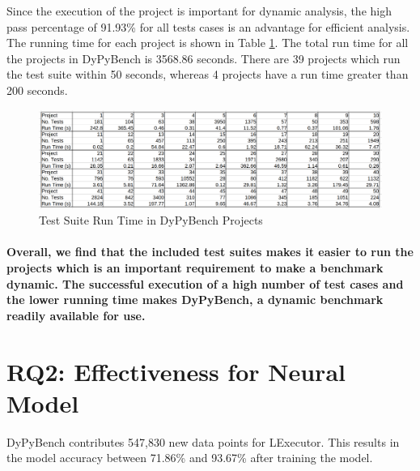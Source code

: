 Since the execution of the project is important for dynamic analysis, the high pass percentage of 91.93\% for all tests cases is an advantage for efficient analysis.
The running time for each project is shown in Table \ref{fig:test_run_times}.
The total run time for all the projects in DyPyBench is 3568.86 seconds.
There are 39 projects which run the test suite within 50 seconds, whereas 4 projects have a run time greater than 200 seconds.
\begin{figure}[ht]
    \centering
    \includegraphics[width=1\linewidth]{figures/evaluation/tests_runtime2.png}
    \caption[Test Suite Run Time]{\label{fig:test_run_times}Test Suite Run Time in DyPyBench Projects}
\end{figure}

\paragraph{Overall, we find that the included test suites makes it easier to run the projects which is an important requirement to make a benchmark dynamic. The successful execution of a high number of test cases and the lower running time makes DyPyBench, a dynamic benchmark readily available for use.}

\section{RQ2: Effectiveness for Neural Model}
DyPyBench contributes 547,830 new data points for LExecutor. 
This results in the model accuracy between 71.86\% and 93.67\% after training the model.

